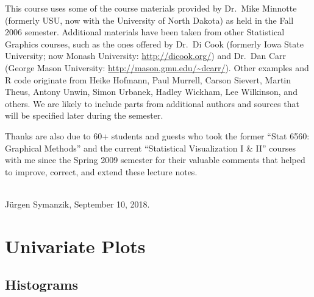 \documentclass[12pt,letterpaper,final]{article}
\begin{document}
This course uses some of the course materials provided by
Dr.\ Mike Minnotte (formerly USU, now with the University of
North Dakota) as held in the Fall 2006 semester. Additional materials
have been taken from other Statistical Graphics courses, such as the
ones offered by Dr.\ Di Cook (formerly Iowa State University; now Monash University:
\url{http://dicook.org/}) and
Dr.\ Dan Carr (George Mason University: \url{http://mason.gmu.edu/~dcarr/}).
Other examples and R code originate from 
Heike Hofmann, Paul Murrell, Carson Sievert,
Martin Theus, Antony Unwin, Simon Urbanek, 
Hadley Wickham, Lee Wilkinson, and others.
We are likely to include parts from additional authors and sources
that will be specified later during the semester.

Thanks are also due to 60+ students and guests who took 
the former ``Stat 6560: Graphical Methods'' and
the current ``Statistical Visualization I \& II'' courses
with me since the Spring 2009 semester 
for their valuable comments that helped
to improve, correct, and extend these lecture notes.

~\\
J\"urgen Symanzik, September 10, 2018.



\newpage

%
{}

\newpage


\setcounter{page}{1}


\def\jsprivatechfive{1} %



\section{Univariate Plots}



\subsection{Histograms}
\end{document}
